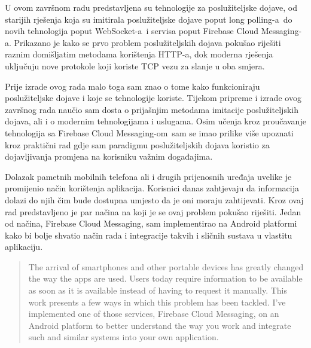 \documentclass[times, utf8, zavrsni]{fer}
\begin{document}
U ovom završnom radu predstavljena su tehnologije za poslužiteljske dojave, od starijih rješenja koja su imitirala poslužiteljske dojave poput \glqq long polling-a\grqq\  do novih tehnologija poput \glqq WebSocket-a\grqq\  i servisa poput \glqq Firebase Cloud Messaging-a\grqq . Prikazano je kako se prvo problem poslužiteljskih dojava pokušao riješiti raznim domišljatim metodama korištenja HTTP-a, dok moderna rješenja uključuju nove protokole koji koriste TCP vezu za slanje u oba smjera.

Prije izrade ovog rada malo toga sam znao o tome kako funkcioniraju poslužiteljske dojave i koje se tehnologije koriste. Tijekom pripreme i izrade ovog završnog rada naučio sam dosta o prijašnjim metodama imitacije poslužiteljskih dojava, ali i o modernim tehnologijama i uslugama. Osim učenja kroz proučavanje tehnologija sa \glqq Firebase Cloud Messaging-om\grqq\  sam se imao prilike više upoznati kroz praktični rad gdje sam paradigmu poslužiteljskih dojava koristio za dojavljivanja promjena na korisniku važnim događajima.




\begin{sazetak}
Dolazak pametnih mobilnih telefona ali i drugih prijenosnih uređaja uvelike je promijenio način korištenja aplikacija. Korisnici danas zahtjevaju da informacija dolazi do njih čim bude dostupna umjesto da je oni moraju zahtijevati. Kroz ovaj rad predstavljeno je par načina na koji je se ovaj problem pokušao riješiti. Jedan od načina, Firebase Cloud Messaging, sam implementirao na Android platformi kako bi bolje shvatio način rada i integracije takvih i sličnih sustava u vlastitu aplikaciju.

\end{sazetak}

\begin{abstract}
The arrival of smartphones and other portable devices has greatly changed the way the apps are used. Users today require information to be available as soon as it is available instead of having to request it manually. This work presents a few ways in which this problem has been tackled. I've implemented one of those services, Firebase Cloud Messaging, on an Android platform to better understand the way you work and integrate such and similar systems into your own application.

\end{abstract}
\end{document}
